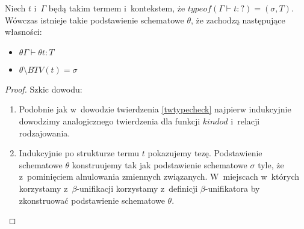\documentclass[11pt,leqno]{article}
\begin{document}
\begin{twierdzenie}
Niech $t$ i~$\Gamma$ będą takim termem i~kontekstem, że $typeof(\Gamma \vdash t : ?) = (\sigma, T)$. Wówczas
istnieje takie podstawienie schematowe $\theta$, że zachodzą następujące własności:
\begin{itemize}
\item $\theta \Gamma \vdash \theta t : T$
\item $\theta \setminus BTV(t) = \sigma$
\end{itemize}
\end{twierdzenie}
\begin{proof}
Szkic dowodu:
\begin{enumerate}
\item Podobnie jak w~dowodzie twierdzenia \ref{twtypecheck} najpierw indukcyjnie dowodzimy analogicznego twierdzenia
dla funkcji $kindod$ i~relacji rodzajowania.
\item Indukcyjnie po strukturze termu $t$ pokazujemy tezę. Podstawienie schematowe $\theta$ konstruujemy tak jak podstawienie schematowe
$\sigma$ tyle, że z~pominięciem alnulowania zmiennych związanych. W~miejscach w~których korzystamy z~$\beta$-unifikacji
korzystamy z~definicji \mbox{$\beta$-unifikatora} by zkonstruować podstawienie schematowe $\theta$.
\end{enumerate}
\end{proof}
\end{document}
